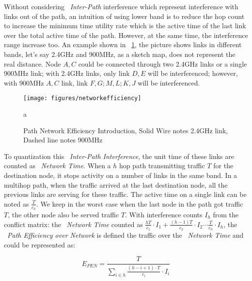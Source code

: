 Without considering ~\emph{Inter-Path} interference which represent interference with links out of the path, 
an intuition of using lower band is to reduce the hop count
 to increase the minimum time utility rate which is the active time of the last link over the total active time of the path. 
However, at the same time, the interference range increase too. An example shown in ~\ref{fig:networkefficiency}, 
the picture shows links in different bands, let's say 2.4GHz and 900MHz, as a sketch map, does not represent the real distance.
Node $A,C$ could be connected through two 2.4GHz links or a single 900MHz link; with 2.4GHz links, only link $D,E$ will be interferenced; however, with 900MHz $A,C$ link, link $F,G;M,L;K,J$ will be interferenced. 


\begin{figure}
\centering
\texttt{[image: figures/networkefficiency]}
\vspace{-0.1in}
\caption{Path Network Efficiency Introduction, Solid Wire notes 2.4GHz link, Dashed line notes 900MHz}
\label{fig:networkefficiency}
a\end{figure}

To quantization this ~\emph{Inter-Path Interference}, 
the unit time of these links are counted as ~\emph{Network Time}. 
When a $h$ hop path transmitting traffic $T$ for the destination node, it stops activity on a number of links in the same band. 
In a multihop path, when the traffic arrived at the last destination node, all the previous links are serving for these traffic.
The active time on a single link can be noted as 
$\frac{T}{c_h}$. We keep in the worst case when the last node in the path got traffic $T$, the other node also be served traffic $T$.
With interference counts $I_h$ from the conflict matrix:
the ~\emph{Network Time} counted as 
$\frac{hT}{c_1}\cdot I_1 + \frac{(h-1)T}{c_2}\cdot I_2 \cdots \frac{T}{c_h}\cdot I_h$, the ~\emph{Path Efficiency over Network} is defined the traffic over the ~\emph{Network Time} and could be represented as:



\begin{equation}
\label{eq:originpen}
E_{PEN}=\frac{T}{\sum_{i \in h}\frac{(h-i+1)\cdot T}{c_i}\cdot I_i }
\end{equation}

